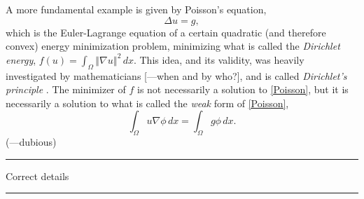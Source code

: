 \documentclass[11pt,a4paper]{memoir}
\newcommand{\norm}[1]{\left\Vert#1\right\Vert}
\newcommand{\todo}[1]{\vskip 0.1in \hrule \vskip 0.03in {#1} \vskip 0.03in \hrule \vskip 0.1in}
\begin{document}
A more fundamental example is given by Poisson's equation,
\begin{equation}\label{Poisson}
    \Delta u = g,
\end{equation}
which is the Euler-Lagrange equation of a certain quadratic (and therefore convex) energy minimization problem, minimizing what is called the \textit{Dirichlet energy},
$f(u) = \int_\Omega \norm{\nabla u}^2\,dx.$
This idea, and its validity, was heavily investigated by mathematicians [---when and by who?], and is called \textit{Dirichlet's principle} \cite{dirichlet_principle}. The minimizer of $f$ is not necessarily a solution to \eqref{Poisson}, but it is necessarily a solution to what is called
the \textit{weak} form of \eqref{Poisson},
\begin{equation}\label{WeakPoisson}
    \int_\Omega u \nabla \phi\,dx  = \int_\Omega g\phi\,dx.
\end{equation}
(---dubious)
\todo{Correct details}
\end{document}
